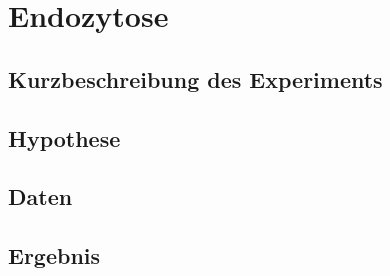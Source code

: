\section{Endozytose}

\subsection{Kurzbeschreibung des Experiments}

\subsection{Hypothese}

\subsection{Daten}

\subsection{Ergebnis}
